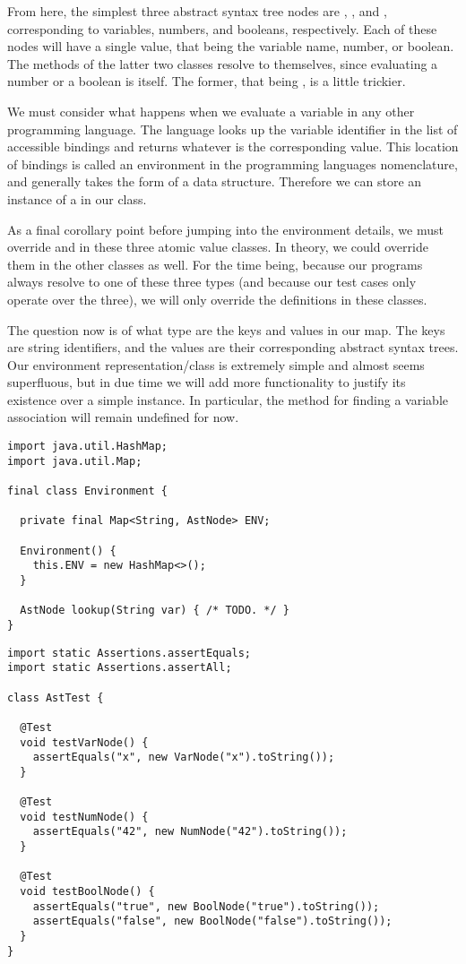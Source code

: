 From here, the simplest three abstract syntax tree nodes are , , and , corresponding to variables, numbers, and booleans, respectively. Each of these nodes will have a single value, that being the variable name, number, or boolean. The  methods of the latter two classes resolve to themselves, since evaluating a number or a boolean is itself. The former, that being , is a little trickier. 

We must consider what happens when we evaluate a variable in any other programming language. The language looks up the variable identifier in the list of accessible bindings and returns whatever is the corresponding value. This location of bindings is called an environment in the programming languages nomenclature, and generally takes the form of a  data structure. Therefore we can store an instance of a  in our  class. 

As a final corollary point before jumping into the environment details, we must override  and  in these three atomic value classes. In theory, we could override them in the other classes as well. For the time being, because our programs always resolve to one of these three types (and because our test cases only operate over the three), we will only override the definitions in these classes.

The question now is of what type are the keys and values in our map. The keys are string identifiers, and the values are their corresponding abstract syntax trees. Our environment representation/class is extremely simple and almost seems superfluous, but in due time we will add more functionality to justify its existence over a simple  instance. In particular, the  method for finding a variable association will remain undefined for now.

\begin{lstlisting}[language=MyJava]
import java.util.HashMap;
import java.util.Map;

final class Environment {
  
  private final Map<String, AstNode> ENV;

  Environment() { 
    this.ENV = new HashMap<>(); 
  }

  AstNode lookup(String var) { /* TODO. */ }
}
\end{lstlisting}

\begin{lstlisting}[language=MyJava]
import static Assertions.assertEquals;
import static Assertions.assertAll;

class AstTest {

  @Test
  void testVarNode() {
    assertEquals("x", new VarNode("x").toString());
  }

  @Test
  void testNumNode() {
    assertEquals("42", new NumNode("42").toString());
  }

  @Test
  void testBoolNode() {
    assertEquals("true", new BoolNode("true").toString());
    assertEquals("false", new BoolNode("false").toString());
  }  
}
\end{lstlisting}


